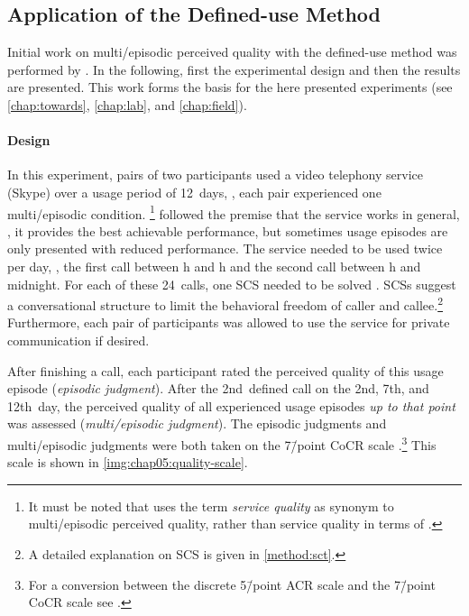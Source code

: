 \subsection{Application of the Defined-use Method \citep{moller_single-call_2011}}\label{prior:moeller}
Initial work on multi\-/episodic perceived quality with the defined-use method was performed by \citet{moller_single-call_2011}.
In the following, first the experimental design and then the results are presented.
This work forms the basis for the here presented experiments (see \autoref{chap:towards}, \autoref{chap:lab}, and \autoref{chap:field}).

\paragraph*{Design}
In this experiment, pairs of two participants used a video telephony service (Skype) over a usage period of 12~days, \ie, each pair experienced one multi\-/episodic condition.
\citet{moller_single-call_2011}\footnote{It must be noted that \citet{moller_single-call_2011} uses the term \emph{service quality} as synonym to multi\-/episodic perceived quality, rather than service quality in terms of \citet{parasuraman_conceptual_1985}.} followed the premise that the service works in general, \ie, it provides the best achievable performance, but sometimes usage episodes are only presented with reduced performance.
The service needed to be used twice per day, \ie, the first call between \unit[6]{h} and \unit[15]{h} and the second call between \unit[15]{h} and midnight.
For each of these 24~calls, one \ac{SCS} needed to be solved \citep{itu-t_recommendation_p.805_subjective_2007}.
\acp{SCS} suggest a conversational structure to limit the behavioral freedom of caller and callee.\footnote{A detailed explanation on \acs{SCS} is given in \autoref{method:sct}.} 
Furthermore, each pair of participants was allowed to use the service for private communication if desired.

After finishing a call, each participant rated the perceived quality of this usage episode (\emph{episodic judgment}).
After the 2nd~defined call on the 2nd, 7th, and 12th~day, the perceived quality of all experienced usage episodes \emph{up to that point} was assessed (\emph{multi\-/episodic judgment}).
The episodic judgments and multi\-/episodic judgments were both taken on the 7\=/point \ac{CoCR} scale \citep[][p.\,18]{itu-t_recommendation_p.832_subjective_2000}.\footnote{For a conversion between the discrete 5\=/point \ac{ACR} scale and the 7\=/point \ac{CoCR} scale see \citet{koster_comparison_2015}.}
This scale is shown in \autoref{img:chap05:quality-scale}.

